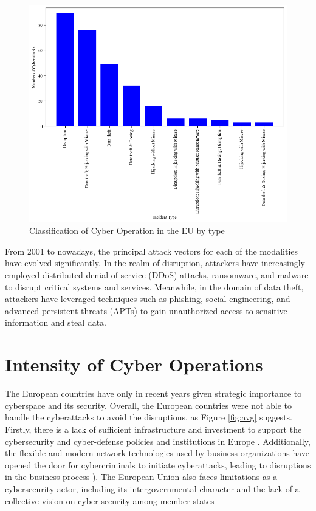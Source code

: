 \begin{figure}[H]
    \centering
    \includegraphics[width=\textwidth]{Images/eu_type.png}
    \caption{Classification of Cyber Operation in the EU by type}
    \label{fig:eu_type}
\end{figure}

From 2001 to nowadays, the principal attack vectors for each of the modalities have evolved significantly. In the realm of disruption, attackers have increasingly employed distributed denial of service (DDoS) attacks, ransomware, and malware to disrupt critical systems and services. Meanwhile, in the domain of data theft, attackers have leveraged techniques such as phishing, social engineering, and advanced persistent threats (APTs) to gain unauthorized access to sensitive information and steal data. 

\section{Intensity of Cyber Operations}

The European countries have only in recent years given strategic importance to cyberspace and its security. Overall, the European countries were not able to handle the cyberattacks to avoid the disruptions, as Figure \ref{fig:avg} suggests. Firstly, there is a lack of sufficient infrastructure and investment to support the cybersecurity and cyber-defense policies and institutions in Europe \autocite{petratos_2014_cybersecurity}.  Additionally, the flexible and modern network technologies used by business organizations have opened the door for cybercriminals to initiate cyberattacks, leading to disruptions in the business process \autocite{sudar_2020_analysis}). The European Union also faces limitations as a cybersecurity actor, including its intergovernmental character and the lack of a collective vision on cyber-security among member states \autocite{sliwinski_2014_moving}


